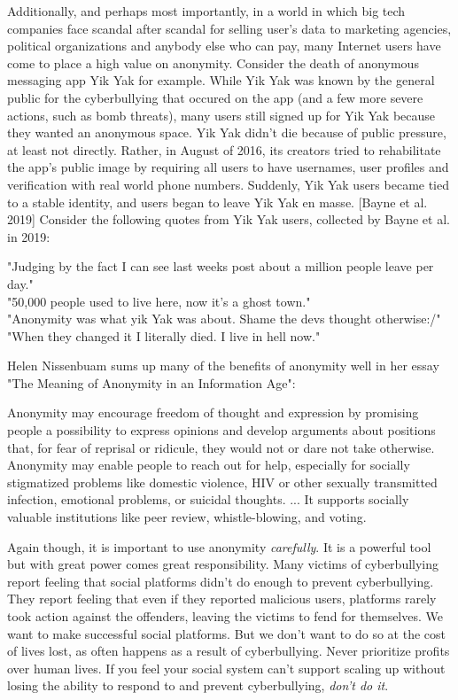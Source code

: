 \documentclass[class=book, crop=false]{standalone}
\begin{document}
Additionally, and perhaps most importantly, in a world in which big tech companies face scandal after scandal for selling user's data to marketing agencies, political organizations and anybody else who can pay, many Internet users have come to place a high value on anonymity. Consider the death of anonymous messaging app Yik Yak for example. While Yik Yak was known by the general public for the cyberbullying that occured on the app (and a few more severe actions, such as bomb threats), many users still signed up for Yik Yak because they wanted an anonymous space. Yik Yak didn't die because of public pressure, at least not directly. Rather, in August of 2016, its creators tried to rehabilitate the app's public image by requiring all users to have usernames, user profiles and verification with real world phone numbers. Suddenly, Yik Yak users became tied to a stable identity, and users began to leave Yik Yak en masse. [Bayne et al. 2019] Consider the following quotes from Yik Yak users, collected by Bayne et al. in 2019:
\begin{center}
"Judging by the fact I can see last weeks post about a million people leave per day."\\
"50,000 people used to live here, now it's a ghost town."\\
"Anonymity was what yik Yak was about. Shame the devs thought otherwise:/"\\
"When they changed it I literally died. I live in hell now."
\end{center}

Helen Nissenbuam sums up many of the benefits of anonymity well in her essay "The Meaning of Anonymity in an Information Age":
\begin{displayquote}
Anonymity may encourage freedom of thought and expression by promising people a possibility to express opinions and develop arguments about positions that, for fear of reprisal or ridicule, they would not or dare not take otherwise. Anonymity may enable people to reach out for help, especially for socially stigmatized problems like domestic violence, HIV or other sexually transmitted infection, emotional problems, or suicidal thoughts. ... It supports socially valuable institutions like peer review, whistle-blowing, and voting.
\end{displayquote}

Again though, it is important to use anonymity \textit{carefully}. It is a powerful tool but with great power comes great responsibility. Many victims of cyberbullying report feeling that social platforms didn't do enough to prevent cyberbullying. They report feeling that even if they reported malicious users, platforms rarely took action against the offenders, leaving the victims to fend for themselves. We want to make successful social platforms. But we don't want to do so at the cost of lives lost, as often happens as a result of cyberbullying. Never prioritize profits over human lives. If you feel your social system can't support scaling up without losing the ability to respond to and prevent cyberbullying, \textit{don't do it}.
\end{document}
